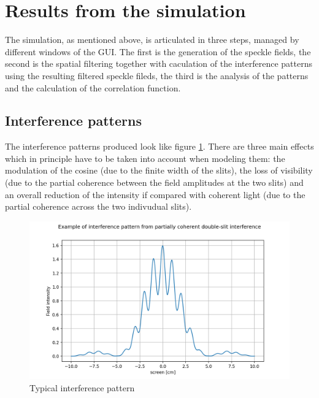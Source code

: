 \section{Results from the simulation}


The simulation, as mentioned above, is articulated in three steps, managed by different windows of the GUI. The first is the generation of the speckle fields, 
the second is the spatial filtering together with caculation of the interference patterns using the resulting filtered speckle fileds, the third is the analysis of 
the patterns and the calculation of the correlation function.



\subsection{Interference patterns}

The interference patterns produced look like figure \ref{patt}. There are three main effects which in principle have to be taken into account when modeling them: 
the modulation of the cosine (due to the finite width of the slits), the loss of visibility (due to the partial coherence between the field amplitudes at the two slits) and 
an overall reduction of the intensity if compared with coherent light (due to the partial coherence across the two indivudual slits).

\begin{figure}[!ht]
    \centering
    \includegraphics[width = .9\textwidth]{Img/pattern.png}
    \caption{Typical interference pattern}
    \label{patt}
\end{figure}